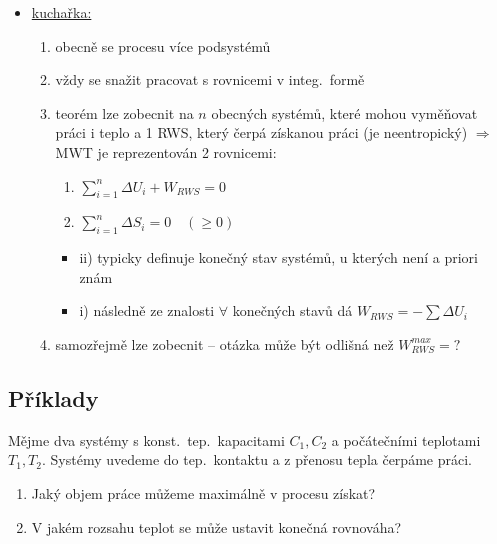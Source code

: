 \begin{itemize}
  \item \underline{kuchařka:}
  \begin{enumerate}[label=\arabic*),start=0]
    \item obecně se procesu  více podsystémů
    \item vždy se snažit pracovat s rovnicemi v integ.\ formě
    \item teorém lze zobecnit na $n$ obecných systémů, které mohou vyměňovat práci i teplo a 1 RWS, který čerpá získanou práci (je neentropický) $\Rightarrow$ MWT je reprezentován 2 rovnicemi:

    \begin{minipage}{0.4\textwidth}
    \begin{veta}[MWT]
    \begin{enumerate}[label=\roman*)]
      \item $\displaystyle\sum_{i=1}^n\Delta U_i + W_{RWS} = 0$
      \item $\displaystyle\sum_{i=1}^n\Delta S_i = 0 \quad (\geq 0)$
    \end{enumerate}
    \end{veta}
    \end{minipage}
    \hfill
    \begin{minipage}{0.45\textwidth}
    \begin{itemize}
      \item ii) typicky definuje konečný stav systémů, u kterých není a priori znám
      \item i) následně ze znalosti $\forall$ konečných stavů dá $W_{RWS} = -\sum\Delta U_i$
    \end{itemize}
    \end{minipage}
    \item samozřejmě lze zobecnit -- otázka může být odlišná než $W_{RWS}^{max} = ?$
  \end{enumerate}
\end{itemize}

\subsection*{Příklady}
\begin{priklad}[Příklad 1]
Mějme dva systémy s konst.\ tep.\ kapacitami $C_1, C_2$ a počátečními teplotami $T_1, T_2$. Systémy uvedeme do tep.\ kontaktu a z přenosu tepla čerpáme práci.
\begin{enumerate}[label=\alph*)]
  \item Jaký objem práce můžeme maximálně v procesu získat?
  \item V jakém rozsahu teplot se může ustavit konečná rovnováha?
\end{enumerate}
\end{priklad}

